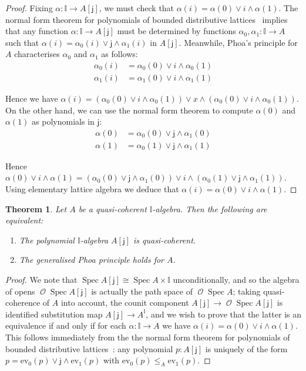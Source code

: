 \documentclass[a4paper,12pt]{amsart}
\newtheorem{theorem}{Theorem}[section]
\theoremstyle{definition}
\newcommand{\mc}[1]{\mathcal{#1}}
\newcommand{\mbb}[1]{\mathbb{#1}}
\newcommand{\I}{\mbb I}
\newcommand{\ms}[1]{\mathsf{#1}}
\newcommand{\ev}{\mathrm{ev}}
\newcommand{\spec}{\operatorname{Spec}}
\newcommand{\opens}{\operatorname{\mc{O}}} %
\begin{document}
\begin{proof}
  Fixing $\alpha\colon \I\to A[\ms{j}]$, we must check that $\alpha(i) = \alpha(0) \vee i \wedge \alpha(1)$. 
  The normal form theorem for polynomials of bounded distributive lattices~\citep[Ch.\ 1, Thm.\ 10.11]{lausch2000algebra} implies that any function $\alpha\colon \I\to A[\ms{j}]$ must be determined by functions $\alpha_0,\alpha_1\colon \I\to A$ such that $\alpha(i) = \alpha_0(i)\vee \ms{j} \wedge \alpha_1(i)$ in $A[\ms{j}]$. Meanwhile, Phoa's principle for $A$ characterises $\alpha_0$ and $\alpha_1$ as follows:
  \begin{align*}
    \alpha_0(i) &= \alpha_0(0) \vee i \wedge \alpha_0(1)
    \\ 
    \alpha_1(i) &= \alpha_1(0) \vee i \wedge \alpha_1(1)
  \end{align*}

  Hence we have $\alpha(i) = (\alpha_0(0) \vee i \wedge \alpha_0(1))\lor x \wedge (\alpha_0(0) \vee i \wedge \alpha_0(1))$. On the other hand, we can use the normal form theorem to compute $\alpha(0)$ and $\alpha(1)$ as polynomials in $\ms{j}$: 
  \begin{align*}
    \alpha(0) &= \alpha_0(0) \vee \ms{j}\wedge \alpha_1(0)\\
    \alpha(1) &= \alpha_0(1) \vee \ms{j}\wedge \alpha_1(1)
  \end{align*}

  Hence $\alpha(0)\lor i \wedge \alpha(1) = (\alpha_0(0) \vee \ms{j}\wedge \alpha_1(0))\vee i \wedge (\alpha_0(1) \vee \ms{j}\wedge \alpha_1(1))$. Using elementary lattice algebra we deduce that $\alpha(i) = \alpha(0) \vee i \wedge \alpha(1)$.
\end{proof}

\begin{theorem}\label{obs:sqcp-phoa-gen}
  Let $A$ be a quasi-coherent $\I$-algebra. Then the following are equivalent:
  \begin{enumerate}
    \item The polynomial $\I$-algebra $A[\ms{j}]$ is quasi-coherent.
    \item The generalised Phoa principle holds for $A$.
  \end{enumerate}
\end{theorem}

\begin{proof}
  We note that $\spec{A[\ms{j}]} \cong \spec{A}\times \I$ unconditionally, and so the algebra of opens $\opens\spec{A[\ms{j}]}$ is actually the path space of $\opens\spec{A}$; taking quasi-coherence of $A$ into account, the counit component $A[\ms{j}]\to \opens\spec A[\ms{j}]$ is identified substitution map $A[\ms{j}] \to A^\I$, and we wish to prove that the latter is an equivalence if and only if for each $\alpha\colon \I\to A$ we have $\alpha(i)=\alpha(0)\vee i\wedge\alpha(1)$. 
  This follows immediately from the the normal form theorem for polynomials of bounded distributive lattices~\citep[Ch.\ 1, Thm.\ 10.11]{lausch2000algebra}: any polynomial $p:A[\ms{j}]$ is uniquely of the form $p = \ev_0(p) \vee \ms{j} \wedge \ev_1(p)$ with $\ev_0(p)\le_A \ev_1(p)$.
\end{proof}
\end{document}
